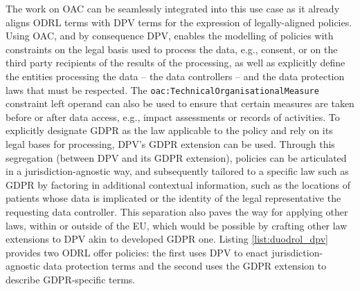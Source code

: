 The work on OAC can be seamlessly integrated into this use case as it already aligns ODRL terms with DPV terms for the expression of legally-aligned policies.
Using OAC, and by consequence DPV, enables the modelling of policies with constraints on the legal basis used to process the data, e.g., consent, or on the third party recipients of the results of the processing, as well as explicitly define the entities processing the data -- the data controllers -- and the data protection laws that must be respected.
The \texttt{oac:TechnicalOrganisationalMeasure} constraint left operand can also be used to ensure that certain measures are taken before or after data access, e.g., impact assessments or records of activities.
To explicitly designate GDPR as the law applicable to the policy and rely on its legal bases for processing, DPV's GDPR extension can be used.
Through this segregation (between DPV and its GDPR extension), policies can be articulated in a jurisdiction-agnostic way, and subsequently tailored to a specific law such as GDPR by factoring in additional contextual information, such as the locations of patients whose data is implicated or the identity of the legal representative the requesting data controller.
This separation also paves the way for applying other laws, within or outside of the EU, which would be possible by crafting other law extensions to DPV akin to developed GDPR one.
Listing \ref{list:duodrol_dpv} provides two ODRL offer policies: the first uses DPV to enact jurisdiction-agnostic data protection terms and the second uses the GDPR extension to describe GDPR-specific terms.

